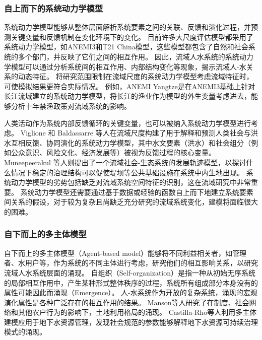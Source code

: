 \subsubsection{自上而下的系统动力学模型}

系统动力学模型能够从整体层面解析系统要素之间的关联、反馈和演化过程\cite{jaeger2017}，并预测关键变量和反馈机制在变化环境下的变化\cite{vaighan2017}。
目前许多大尺度评估模型都采用了系统动力学模型，如ANEMI3和T21 China模型，这些模型都包含了自然和社会系统的多个部门，并反映了它们之间的相互作用\cite{breach2021, qu2020}。
因此，流域人水系统的系统动力学模型可以通过分析系统间的相互作用、内部结构变化等现象，揭示流域人-水关系的动态特征。
将研究范围限制在流域尺度的系统动力学模型考虑流域特征时，可使模拟结果更符合实际情况。
例如，ANEMI Yangtze是在ANEMI3基础上针对长江流域建立的系统动力学模型\cite{jiang2022}，将长江的渔业作为模型的外生变量考虑进去，能够分析十年禁渔政策对流域系统的影响\cite{jiang2022}。

人类活动作为系统内部反馈循环的关键变量，也可以被纳入系统动力学模型进行考虑。
Viglione 和 Baldassarre 等人在流域尺度构建了用于解释和预测人类社会与洪水互相反馈、协同演化的系统动力学模型\cite{viglione2014,dibaldassarre2015}，其中水文要素（洪水）和社会组分（例如公众意识、风险文化、经济发展等）被视为反馈过程的核心变量\cite{song2021a,ciullo2017}。
Muneepeerakul 等人则提出了一个流域社会-生态系统的发展轨迹模型，以探讨什么情况下稳定的治理结构可以促使堤坝等公共基础设施在系统中内生地出现\cite{muneepeerakul2017}。
系统动力学模型的劣势包括缺乏对流域系统空间特征的识别，这在流域研究中非常重要。
系统动力学模型还需要通过基于数据或经验的函数自上而下地建立系统要素间关系的假设，对于较为复杂且尚缺乏充分研究的流域系统变化，建模将面临很大的困难。

\subsubsection{自下而上的多主体模型}

自下而上的多主体模型（Agent-based model）能够将不同利益相关者，如管理者、水用户等，作为系统的不同主体进行考虑，研究他们的相互影响关系，以研究流域人水系统层面的涌现\cite{biggs2021}。
自组织（Self-organization）是指一种从初始无序系统的局部相互作用中，产生某种形式整体秩序的过程\cite{berkes2008}，系统所有组成部分本身没有的属性可能因此而涌现（Emergence）。
人-水系统作为开放的复杂系统，涌现的宏观演化属性是各种广泛存在的相互作用的结果\cite{schluter2019}。
Manson等人研究了在制度、社会网络和其他农户行为的影响下，土地利用格局的涌现\cite{manson2016}。
Castilla-Rho等人利用多主体建模应用于地下水资源管理，发现社会规范的参数能够解释地下水资源可持续治理模式的涌现\cite{castilla-rho2017a,castilla-rho2015,castilla-rho2019,castilla-rho2017}。

